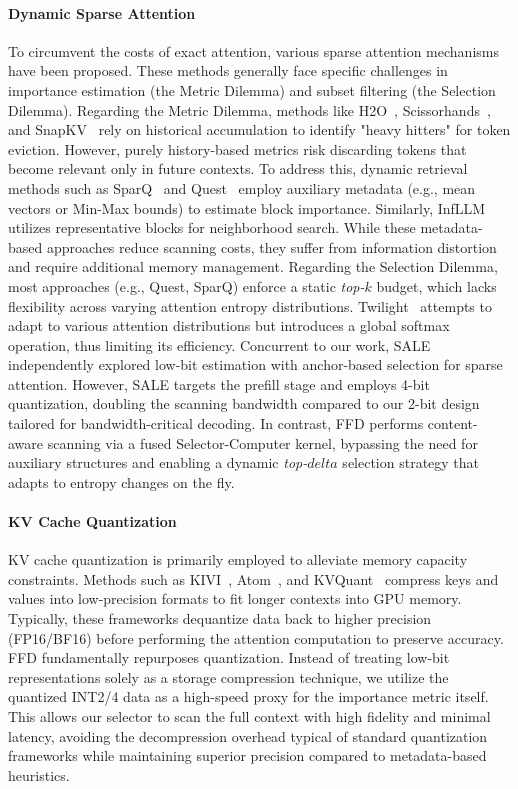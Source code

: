 \documentclass[]{mosi}
\def\delta{delta}%
\theoremstyle{plain}
\theoremstyle{definition}
\theoremstyle{remark}
\begin{document}
\paragraph{Dynamic Sparse Attention}
To circumvent the costs of exact attention, various sparse attention mechanisms have been proposed. These methods generally face specific challenges in importance estimation (the Metric Dilemma) and subset filtering (the Selection Dilemma).
Regarding the Metric Dilemma, methods like H2O~\citep{zhang2023h2o}, Scissorhands~\citep{liu2023scissorhands}, and SnapKV~\citep{li2024snapkv} rely on historical accumulation to identify "heavy hitters" for token eviction. However, purely history-based metrics risk discarding tokens that become relevant only in future contexts. To address this, dynamic retrieval methods such as SparQ~\citep{ribar2023sparq} and Quest~\citep{tang2024quest} employ auxiliary metadata (e.g., mean vectors or Min-Max bounds) to estimate block importance. Similarly, InfLLM~\citep{xiao2024infllm} utilizes representative blocks for neighborhood search. While these metadata-based approaches reduce scanning costs, they suffer from information distortion and require additional memory management.
Regarding the Selection Dilemma, most approaches (e.g., Quest, SparQ) enforce a static \textit{top-$k$} budget, which lacks flexibility across varying attention entropy distributions. Twilight~\citep{lin2025twilight} attempts to adapt to various attention distributions but introduces a global softmax operation, thus limiting its efficiency. Concurrent to our work, SALE~\citep{ji2025salelowbitestimation} independently explored low-bit estimation with anchor-based selection for sparse attention. However, SALE targets the prefill stage and employs 4-bit quantization, doubling the scanning bandwidth compared to our 2-bit design tailored for bandwidth-critical decoding.
In contrast, FFD performs content-aware scanning via a fused Selector-Computer kernel, bypassing the need for auxiliary structures and enabling a dynamic \textit{top-$\delta$} selection strategy that adapts to entropy changes on the fly.

\paragraph{KV Cache Quantization}
KV cache quantization is primarily employed to alleviate memory capacity constraints. Methods such as KIVI~\citep{liu2024kivi}, Atom~\citep{zhao2024atom}, and KVQuant~\citep{hooper2024kvquant} compress keys and values into low-precision formats to fit longer contexts into GPU memory. Typically, these frameworks dequantize data back to higher precision (FP16/BF16) before performing the attention computation to preserve accuracy.
FFD fundamentally repurposes quantization. Instead of treating low-bit representations solely as a storage compression technique, we utilize the quantized INT2/4 data as a high-speed proxy for the importance metric itself. This allows our selector to scan the full context with high fidelity and minimal latency, avoiding the decompression overhead typical of standard quantization frameworks while maintaining superior precision compared to metadata-based heuristics.
\end{document}
